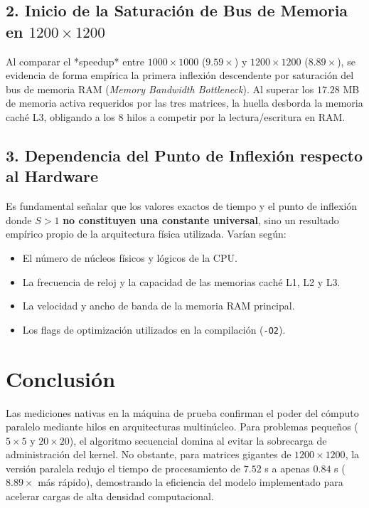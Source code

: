 \documentclass[runningheads]{llncs}
\begin{document}
\subsection{2. Inicio de la Saturación de Bus de Memoria en $1200 \times 1200$}
Al comparar el *speedup* entre $1000 \times 1000$ ($9.59\times$) y $1200 \times 1200$ ($8.89\times$), se evidencia de forma empírica la primera inflexión descendente por saturación del bus de memoria RAM (\textit{Memory Bandwidth Bottleneck}). Al superar los $17.28$ MB de memoria activa requeridos por las tres matrices, la huella desborda la memoria caché L3, obligando a los 8 hilos a competir por la lectura/escritura en RAM.

\subsection{3. Dependencia del Punto de Inflexión respecto al Hardware}
Es fundamental señalar que los valores exactos de tiempo y el punto de inflexión donde $S > 1$ \textbf{no constituyen una constante universal}, sino un resultado empírico propio de la arquitectura física utilizada. Varían según:
\begin{itemize}
    \item El número de núcleos físicos y lógicos de la CPU.
    \item La frecuencia de reloj y la capacidad de las memorias caché L1, L2 y L3.
    \item La velocidad y ancho de banda de la memoria RAM principal.
    \item Los flags de optimización utilizados en la compilación (\texttt{-O2}).
\end{itemize}

\section{Conclusión}
Las mediciones nativas en la máquina de prueba confirman el poder del cómputo paralelo mediante hilos en arquitecturas multinúcleo. Para problemas pequeños ($5 \times 5$ y $20 \times 20$), el algoritmo secuencial domina al evitar la sobrecarga de administración del kernel. No obstante, para matrices gigantes de $1200 \times 1200$, la versión paralela redujo el tiempo de procesamiento de $7.52$ s a apenas $0.84$ s ($8.89\times$ más rápido), demostrando la eficiencia del modelo implementado para acelerar cargas de alta densidad computacional.
\end{document}
